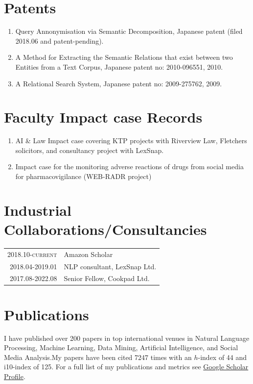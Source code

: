 \documentclass[a4paper,11pt]{article}
\begin{document}
\section{Patents}
\begin{enumerate}
\item Query Annonymisation via Semantic Decomposition, Japanese patent (filed 2018.06 and patent-pending).
\item A Method for Extracting the Semantic Relations that exist between two Entities from a Text Corpus, Japanese patent no: 2010-096551, 2010.
\item A Relational Search System, Japanese patent no: 2009-275762, 2009.
\end{enumerate}

\section{Faculty Impact case Records}
\begin{enumerate}
\item AI \& Law Impact case covering KTP projects with Riverview Law, Fletchers solicitors, and consultancy project with LexSnap.
\item Impact case for the monitoring adverse reactions of drugs from social media for pharmacovigilance (WEB-RADR project)
\end{enumerate}

\section{Industrial Collaborations/Consultancies}

\begin{tabular}{r p{11cm}}
\textsc{2018.10-current} & Amazon Scholar\\
\textsc{2018.04-2019.01} & NLP consultant, LexSnap Ltd.\\
\textsc{2017.08-2022.08} & Senior Fellow, Cookpad Ltd. \\
\end{tabular}


\newpage
\section{Publications}

I have published over 200 papers in top international venues in Natural Language Processing, Machine Learning, Data Mining, Artificial Intelligence, and Social Media Analysis.My papers have been cited 7247 times with an $h$-index of 44 and i10-index of 125.
For a full list of my publications and metrics see \href{https://goo.gl/mnhgp6}{Google Scholar Profile}.
\end{document}
